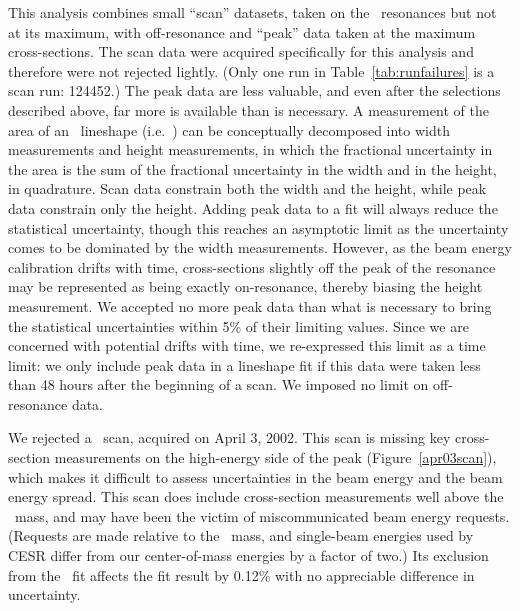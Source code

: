\documentclass{cornell}
\begin{document}
This analysis combines small ``scan'' datasets, taken on the \ups\
resonances but not at its maximum, with off-resonance and ``peak''
data taken at the maximum cross-sections.  The scan data were acquired
specifically for this analysis and therefore were not rejected
lightly.  (Only one run in Table~\ref{tab:runfailures} is a scan run:
124452.)  The peak data are less valuable, and even after the
selections described above, far more is available than is necessary.
A measurement of the area of an \ups\ lineshape (i.e.\ \gee) can be
conceptually decomposed into width measurements and height
measurements, in which the fractional uncertainty in the area is the
sum of the fractional uncertainty in the width and in the height, in
quadrature.  Scan data constrain both the width and the height, while
peak data constrain only the height.  Adding peak data to a fit will
always reduce the statistical uncertainty, though this reaches an
asymptotic limit as the uncertainty comes to be dominated by the width
measurements.  However, as the beam energy calibration drifts with
time, cross-sections slightly off the peak of the resonance may be
represented as being exactly on-resonance, thereby biasing the height
measurement.  We accepted no more peak data than what is necessary to
bring the statistical uncertainties within 5\% of their limiting
values.  Since we are concerned with potential drifts with time, we
re-expressed this limit as a time limit: we only include peak data in
a lineshape fit if this data were taken less than 48 hours after the
beginning of a scan.  We imposed no limit on off-resonance data.

We rejected a \us\ scan, acquired on April 3, 2002.  This scan is
missing key cross-section measurements on the high-energy side of the
peak (Figure~\ref{apr03scan}), which makes it difficult to assess
uncertainties in the beam energy and the beam energy spread.  This
scan does include cross-section measurements well above the \ups\
mass, and may have been the victim of miscommunicated beam energy
requests.  (Requests are made relative to the \ups\ mass, and
single-beam energies used by CESR differ from our center-of-mass
energies by a factor of two.)  Its exclusion from the \us\ fit affects
the fit result by 0.12\% with no appreciable difference in
uncertainty.
\end{document}
